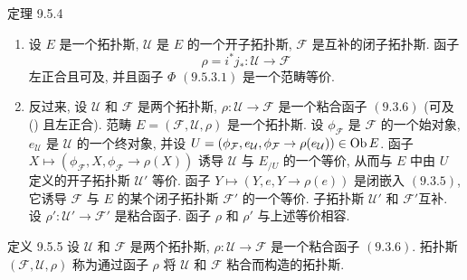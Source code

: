 \begin{enonce*}{定理 9.5.4}
\begin{enumerate}
\renewcommand{\theenumi}{\alph{enumi}}
\renewcommand{\labelenumi}{\theenumi)}
\item 设 $E$ 是一个拓扑斯, $\mathcal{U}$ 是 $E$ 的一个开子拓扑斯,
$\mathcal{F}$ 是互补的闭子拓扑斯.
函子
$$
\rho=i^{\ast}j_{\ast}:\mathcal{U} \longrightarrow \mathcal{F}
$$
左正合且可及,
并且函子 $\Phi$ $\hyperref[IV.eq9.5.3.1]{(9.5.3.1)}$ 是一个范畴等价.

\item 反过来, 设 $\mathcal{U}$ 和 $\mathcal{F}$ 是两个拓扑斯,
$\rho:\mathcal{U}\rightarrow\mathcal{F}$ 是一个粘合函子
$(\hyperref[IV.subsubsec9.3.6]{9.3.6})$
(\ie 可及 {\rm ()} 且左正合).
范畴 $E=(\mathcal{F},\mathcal{U},\rho)$ 是一个拓扑斯.
设 $\phi_{\mathcal{F}}$ 是 $\mathcal{F}$ 的一个始对象,
$e_{\mathcal{U}}$ 是 $\mathcal{U}$ 的一个终对象,
并设 $U=(\phi_{\mathcal{F}},e_{\mathcal{U}},
\phi_{\mathcal{F}}\rightarrow\rho(e_{\mathcal{U}}))\in\operatorname{Ob} E$.
函子 $X\mapsto(\phi_{\mathcal{F}},X,\phi_{\mathcal{F}}\rightarrow\rho(X))$
诱导 $\mathcal{U}$ 与 $E_{/U}$ 的一个等价,
从而与 $E$ 中由 $U$ 定义的开子拓扑斯 $\mathcal{U}'$ 等价.
函子 $Y\mapsto(Y,e,Y\rightarrow\rho(e))$ 是闭嵌入
$(\hyperref[IV.subsubsec9.3.5]{9.3.5})$,
\ie 它诱导 $\mathcal{F}$ 与 $E$ 的某个闭子拓扑斯 $\mathcal{F}'$ 的一个等价.
子拓扑斯 $\mathcal{U}'$ 和 $\mathcal{F}'$\pageoriginale 互补.
设 $\rho':\mathcal{U}'\rightarrow\mathcal{F}'$ 是粘合函子.
函子 $\rho$ 和 $\rho'$ 与上述等价相容.
\end{enumerate}
\end{enonce*}

\begin{enonce*}{定义 9.5.5}
设 $\mathcal{U}$ 和 $\mathcal{F}$ 是两个拓扑斯,
$\rho:\mathcal{U}\rightarrow\mathcal{F}$ 是一个粘合函子
$(\hyperref[IV.subsubsec9.3.6]{9.3.6})$.
拓扑斯 $(\mathcal{F},\mathcal{U},\rho)$
称为通过函子 $\rho$ 将 $\mathcal{U}$ 和 $\mathcal{F}$ 粘合而构造的拓扑斯.
\end{enonce*}

\setcounter{subsubsection}{5}
